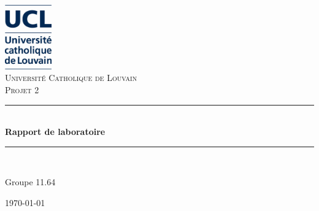 \documentclass[a4paper,11pt]{article}
\begin{document}

\newcommand{\HRule}{\rule{\linewidth}{0.5mm}}

\fancyhf{} %
\fancyhead[R]{\thepage} %


\pagestyle{fancy}
\thispagestyle{empty}
\begin{center}

\includegraphics[width=0.15\textwidth]{images/logo.JPG}~\\[1cm]

\textsc{\LARGE Université Catholique de Louvain}\\[1.5cm]

\textsc{\Large Projet 2}\\[0.5cm]

\HRule \\[0.4cm]
{ \huge \bfseries Rapport de laboratoire \\[0.4cm] }

\HRule \\[1.5cm]

\begin{minipage}{0.4\textwidth}
\begin{flushleft} \large
Groupe \textsc{11.64} \\

\end{flushleft}
\end{minipage}
\begin{minipage}{0.4\textwidth}
\begin{flushright} \large
\end{flushright}
\end{minipage}

\vfill

{\large \today}
\end{center}
 \tableofcontents %
\end{document}
